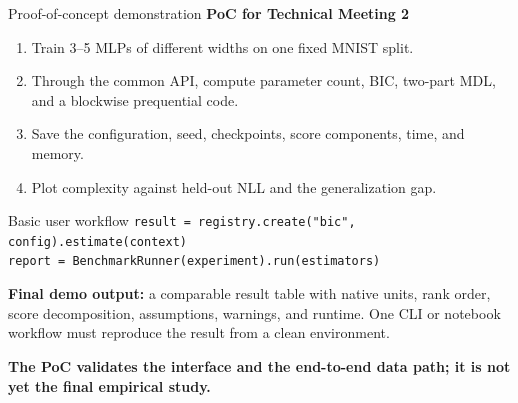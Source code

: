 \documentclass[aspectratio=169,notheorems]{beamer}
\newcommand{\code}[1]{\texttt{#1}}
\newcommand{\take}[1]{%
  \par\vspace{0.35em}{\color{myblue}\hrule height 0.6pt}%
  \vspace{0.25em}\noindent\textbf{#1}\par}
\begin{document}
\begin{frame}{Proof-of-concept demonstration}
\small
\textbf{PoC for Technical Meeting 2}
\begin{enumerate}\setlength{\itemsep}{0.32em}
  \item Train 3--5 MLPs of different widths on one fixed MNIST split.
  \item Through the common API, compute parameter count, BIC, two-part MDL, and a
        blockwise prequential code.
  \item Save the configuration, seed, checkpoints, score components, time, and memory.
  \item Plot complexity against held-out NLL and the generalization gap.
\end{enumerate}

\medskip
\begin{block}{Basic user workflow}
\code{result = registry.create("bic", config).estimate(context)}\\
\code{report = BenchmarkRunner(experiment).run(estimators)}
\end{block}

\textbf{Final demo output:} a comparable result table with native units, rank order,
score decomposition, assumptions, warnings, and runtime. One CLI or notebook workflow
must reproduce the result from a clean environment.

\take{The PoC validates the interface and the end-to-end data path; it is not yet the
final empirical study.}
\end{frame}
\end{document}
